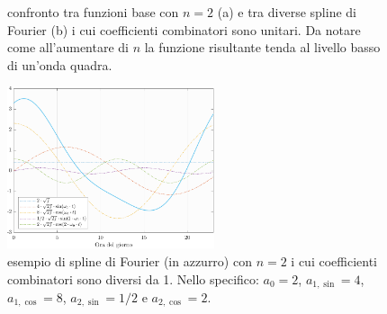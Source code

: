 \begin{figure}[htp]
	\centering
	\quad
	\caption[Confronto tra funzioni base con $n=2$ e tra diverse spline di Fourier]{confronto tra funzioni base con $n=2$ (a) e tra diverse spline di Fourier (b) i cui coefficienti combinatori sono unitari. Da notare come all'aumentare di $n$ la funzione risultante tenda al livello basso di un'onda quadra.}
	\label{esempi_Fourier}
\end{figure}
\begin{figure}[htp]
	\centering
	\includegraphics[height=180px]{Immagini/1. Modello base/Spline Fourier con coefficienti non unitari}
	\caption[Esempio di spline di Fourier con $n=2$ i cui coefficienti combinatori sono diversi da \num{1}]{esempio di spline di Fourier (in azzurro) con $n=2$ i cui coefficienti combinatori sono diversi da \num{1}. Nello specifico: $a_0 = 2$, $a_{1,\sin} = 4$, $a_{1,\cos} = 8$, $a_{2,\sin} = 1/2$ e $a_{2,\cos} = 2$.}
	\label{esempio_Fourier_coef_non_unitari}
\end{figure}

